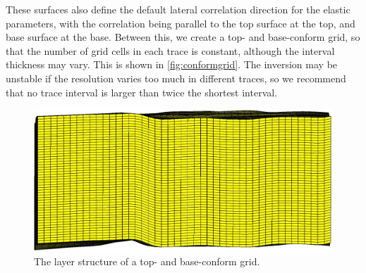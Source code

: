 These surfaces also define the default lateral correlation direction for the elastic parameters, with the correlation being parallel to the top surface at the top, and base surface at the base. Between this, we create a top- and base-conform grid, so that the number of grid cells in each trace is constant, although the interval thickness may vary. This is shown in \autoref{fig:conformgrid}. The inversion may be unstable if the resolution varies too much in different traces, so we recommend that no trace interval is larger than twice the shortest interval.
\begin{figure}[H]
  \includegraphics[width=.99\linewidth]{images/conformgrid}
  \caption{The layer structure of a top- and base-conform grid.}
  \label{fig:conformgrid}
\end{figure}
